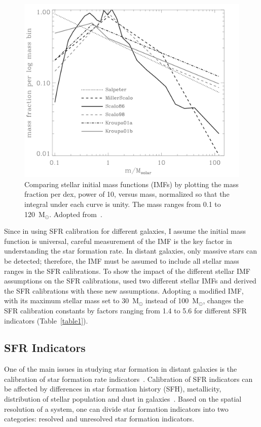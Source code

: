 \begin{figure}
\centering
\includegraphics[width=16cm]{../image_intro/imf.png}
\small
\caption[Comparing stellar initial mass functions]{Comparing stellar initial mass functions (IMFs) by plotting the mass fraction per dex, power of 10, versus mass, normalized so that the integral under each curve is unity. The mass ranges from 0.1 to 120~M$_\odot$. Adopted from~\cite{Baldry03}.} 
\label{fig: imf}
\end{figure}


Since in using SFR calibration for different galaxies, I assume the initial mass function is universal, careful measurement of the IMF is the key factor in understanding the star formation rate. 
In distant galaxies, only massive stars can be detected; therefore, the IMF must be assumed to include all stellar mass ranges in the SFR calibrations. 
To show the impact of the different stellar IMF assumptions on the SFR calibrations, \cite{Calzetti13} used two different stellar IMFs and derived the SFR calibrations with these new assumptions.
Adopting a modified \cite{Kroupa01} IMF, with its maximum stellar mass set to 30~M$_{\odot}$ instead of 100~M$_{\odot}$, changes the SFR calibration constants by factors ranging from 1.4 to 5.6 for different SFR indicators (Table~\ref{table1}). 

\subsection{SFR Indicators}

One of the main issues in studying star formation in distant galaxies is the calibration of star formation rate indicators~\citep[e.g.,][]{Lee10}. 
Calibration of SFR indicators can be affected by differences in star formation history (SFH), metallicity, distribution of stellar population and dust in galaxies~\citep{Calzetti13}. 
Based on the spatial resolution of a system, one can divide star formation indicators into two categories: resolved and unresolved star formation indicators.

